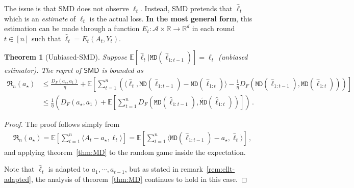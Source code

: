 \documentclass{article}
\theoremstyle{plain}
\newtheorem{theorem}{Theorem}
\theoremstyle{definition}
\newcommand{\R}{\mathbb R}
\newcommand{\Rd}{\mathbb{R}^d}
\newcommand{\Reg}{\mathfrak{R}}
\newcommand{\E}{\mathbb E}
\newcommand{\cA}{\mathcal A}
\newcommand{\fmd}{\texttt{MD}}
\newcommand{\tfmd}{\widetilde{\texttt{MD}}}
\newcommand{\smdalg}{\textsf{SMD}\xspace}
\newcommand{\hl}{\hat{\ell}\xspace}
\begin{document}
\marginnote{\textit{$\hl$ vs $\ell$}}
The issue is that \smdalg does not observe $\ell_t$.
Instead, \smdalg pretends that $\hl_t$ which is an \textit{estimate} of $\ell_t$ is the actual loss.
\textbf{In the most general form}, this estimation can be made through a function
$E_t: \cA \times \R \to \Rd$ in each round $t \in [n]$ such that $\hl_t = E_t(A_t, Y_t)$.
\begin{theorem}[Unbiased-\smdalg]\label{thm:SMD-unbiased}
    Suppose $\E[\hl_t|\fmd(\hl_{1:t-1})] = \ell_t$ (unbiased estimator).
    The regret of $\smdalg$ is bounded as
    \begin{align*}
        \Reg_n(a_\star)
         & \leq
        \frac{D_F(a_\star, a_1)}{\eta}
        +
        \E\left[
            \sum_{t=1}^{n}
            \left(
            \langle \hl_t, \fmd(\hl_{1:t-1}) - \fmd(\hl_{1:t}) \rangle
            - \frac{1}{\eta}
            D_F(\fmd(\hl_{1:t-1}), \fmd(\hl_{1:t}))
            \right)
        \right] \\
         & \leq
        \frac{1}{\eta}\left(
        D_F(a_\star, a_1)
        +
        \E\left[
            \sum_{t=1}^{n} D_F(\fmd(\hl_{1:t-1}), \tfmd(\hl_{1:t}))
            \right]
        \right)\,.
    \end{align*}
\end{theorem}
\begin{proof}
    The proof follows simply from
    \begin{align*}
        \Reg_n(a_\star)
        =
        \E\left[
            \sum_{t=1}^{n} \langle A_t - a_\star, \ell_t\rangle
            \right]
        =
        \E\left[
            \sum_{t=1}^{n} \langle \fmd(\hl_{1:t-1}) - a_\star, \hl_t\rangle
            \right]\,,
    \end{align*}
    and applying theorem~\ref{thm:MD} to the random game inside the expectation.

    Note that $\hl_t$ is adapted to $a_1, \cdots, a_{t-1}$, but as stated in
    remark~\ref{rem:ellt-adapted}, the analysis of theorem~\ref{thm:MD}
    continues to hold in this case.
\end{proof}
\end{document}

